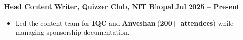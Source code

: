 \documentclass[a4paper,10pt]{article}
\begin{document}
\noindent\textbf{Head Content Writer, Quizzer Club, NIT Bhopal} \hfill \textbf{Jul 2025 -- Present}
\begin{itemize}[label={\textbullet}, leftmargin=15pt, itemsep=1pt, topsep=1pt]
    \item Led the content team for \textbf{IQC} and \textbf{Anveshan} (\textbf{200+ attendees}) while managing sponsorship documentation.
\end{itemize}
\end{document}
